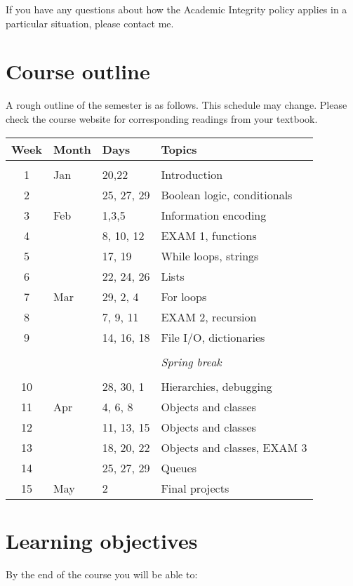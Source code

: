\documentclass{article}
\begin{document}
If you have any questions about how the Academic Integrity policy
applies in a particular situation, please contact me.

\section*{Course outline}

A rough outline of the semester is as follows.  This schedule may
change.  Please check the course website for corresponding readings
from your textbook.


\begin{tabular}{cllp{3in}}
  Week & Month & Days & Topics \\
  \hline \\
  1 & Jan & 20,22 & Introduction \\
  2 &     & 25, 27, 29 & Boolean logic, conditionals \\
  3 & Feb & 1,3,5 & Information encoding \\
  4 &     & 8, 10, 12 & EXAM 1, functions \\
  5 &     & 17, 19 & While loops, strings \\
  6 &     & 22, 24, 26 & Lists \\
  7 & Mar & 29, 2, 4 & For loops \\
  8 &     & 7, 9, 11 & EXAM 2, recursion \\
  9 &     & 14, 16, 18 & File I/O, dictionaries \\
  & & & \\
  & & & \emph{Spring break} \\
  & & & \\
  10 &    & 28, 30, 1 & Hierarchies, debugging \\
  11 & Apr & 4, 6, 8 & Objects and classes \\
  12 &     & 11, 13, 15 & Objects and classes \\
  13 &     & 18, 20, 22 & Objects and classes, EXAM 3 \\
  14 &     & 25, 27, 29 & Queues \\
  15 & May & 2 & Final projects
\end{tabular}

\section*{Learning objectives}

By the end of the course you will be able to:
\end{document}
